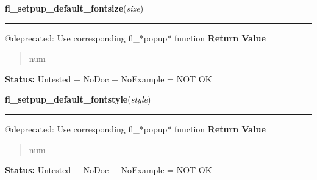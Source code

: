     \vspace{0.5ex}

\hspace{.8\funcindent}\begin{boxedminipage}{\funcwidth}

    \raggedright \textbf{fl\_setpup\_default\_fontsize}(\textit{size})

    \vspace{-1.5ex}

    \rule{\textwidth}{0.5\fboxrule}
\setlength{\parskip}{2ex}

@deprecated: Use corresponding fl\_*popup* function
\setlength{\parskip}{1ex}
      \textbf{Return Value}
    \vspace{-1ex}

      \begin{quote}

num
      \end{quote}

\textbf{Status:} 
Untested + NoDoc + NoExample = NOT OK


    \end{boxedminipage}

    \label{xformslib:deprecated:fl_setpup_default_fontstyle}

    \vspace{0.5ex}

\hspace{.8\funcindent}\begin{boxedminipage}{\funcwidth}

    \raggedright \textbf{fl\_setpup\_default\_fontstyle}(\textit{style})

    \vspace{-1.5ex}

    \rule{\textwidth}{0.5\fboxrule}
\setlength{\parskip}{2ex}

@deprecated: Use corresponding fl\_*popup* function
\setlength{\parskip}{1ex}
      \textbf{Return Value}
    \vspace{-1ex}

      \begin{quote}

num
      \end{quote}

\textbf{Status:} 
Untested + NoDoc + NoExample = NOT OK


    \end{boxedminipage}

